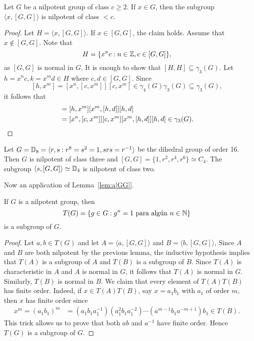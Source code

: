 \begin{lemma}
	\label{lem:a[GG]}
	Let $G$ be a nilpotent group of class $c\geq2$. If $x\in G$, then the subgroup 
	$\langle x,[G,G]\rangle$ is nilpotent of class $<c$.
\end{lemma}

\begin{proof}
	Let $H=\langle x,[G,G]\rangle$.  If $x\in [G,G]$, the claim holds. 
	Assume that $x\not\in [G,G]$. Note that  
	\[
		H=\{x^nc:n\in\mathbb{Z},c\in [G,G]\},
	\]
	as $[G,G]$ is normal in $G$. It is enough to show that   
	$[H,H]\subseteq\gamma_3(G)$. Let $h=x^nc,k=x^md\in H$
	where $c,d\in [G,G]$. 
	Since 
	\[
	[h,x^m]=[x^n,[c,x^m]][c,x^m]\in\gamma_4(G)\gamma_3(G)\subseteq\gamma_3(G),
	\]
	it follows that  
	\begin{align*}
		[h,k]&=[h,x^m][x^m,[h,d]][h,d]\\
			&=[x^n,[c,x^m]][c,x^m][x^m,[h,d]][h,d]\in\gamma_3(G).\qedhere
	\end{align*}
\end{proof}

\begin{example}
	Let $G=\mathbb{D}_{8}=\langle r,s:r^{8}=s^2=1,srs=r^{-1}\rangle$ be the dihedral group of order 
	16. Then $G$ is nilpotent of class three and 
	$[G,G]=\{1,r^2,r^4,r^6\}\simeq C_4$. The subgroup $\langle
	s,[G,G]\rangle\simeq\mathbb{D}_4$ is nilpotent of class two.
\end{example}

Now an application of Lemma~\ref{lem:a[GG]}. 

\begin{theorem}
	\label{thm:T(nilpotent)}
	If $G$ is a nilpotent group, then 
	\[
	T(G)=\{g\in G:g^n=1\text{ para algún $n\in\mathbb{N}$}\}
	\]
	is a subgroup of $G$. 
\end{theorem}

\begin{proof}
	Let $a,b\in T(G)$ and let $A=\langle a,[G,G]\rangle$ and $B=\langle b,[G,G]\rangle$, 
	Since $A$ and $B$ are both nilpotent by the previous lemma, the inductive hypothesis implies that
	$T(A)$ is a subgroup of $A$ and $T(B)$ is a subgroup of $B$. 
	Since $T(A)$ is characteristic in $A$ and $A$ is normal in $G$, it follows that 
	$T(A)$ is
	normal in $G$. Similarly, $T(B)$ is normal in $B$.  
	We claim that every element of $T(A)T(B)$ has finite order. Indeed, if 
	$x\in T(A)T(B)$, say $x=a_1b_1$ with 
	$a_1$ of order $m$, then $x$ has finite order since  
	\begin{align*}
	x^m=(a_1b_1)^m&=
		(a_1b_1a_1^{-1})(a_1^2b_1a_1^{-2})\cdots (a^{m-1} b_1 a^{-m+1})b_1\in T(B).
	\end{align*}
	This trick allows us to prove that both $ab$ and $a^{-1}$ have finite order. 
	Hence $T(G)$ is a subgroup of $G$. 
\end{proof}

